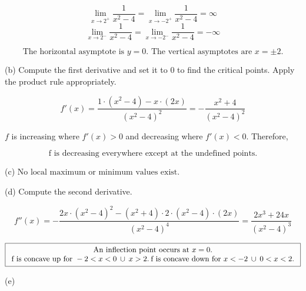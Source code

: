 \documentclass{article}
\begin{document}
\[\lim_{x\to2^+}\frac{1}{x^2-4}=\lim_{x\to-2^+}\frac{1}{x^2-4}=\infty\]
\[\lim_{x\to2^-}\frac{1}{x^2-4}=\lim_{x\to-2^-}\frac{1}{x^2-4}=-\infty\]

\[\boxed{\text{The horizontal asymptote is } y= 0. \text{ The vertical asymptotes are } x=\pm2.}\]

\hfill

\noindent (b) Compute the first derivative and set it to $0$ to find the critical points. Apply the product rule appropriately.

\[f'(x)=\frac{1\cdot\left(x^2-4\right)-x\cdot(2x)}{\left(x^2-4\right)^2}=-\frac{x^2+4}{\left(x^2-4\right)^2}\]

\noindent $f$ is increasing where $f'(x)>0$ and decreasing where $f'(x)<0$. Therefore,

\[\boxed{\text{f is decreasing everywhere except at the undefined points.}}\]

\hfill

\noindent (c) $\boxed{\text{No local maximum or minimum values exist.}}$

\hfill

\noindent (d) Compute the second derivative.

\[f''(x)=-\frac{2x\cdot\left(x^2-4\right)^2-\left(x^2+4\right)\cdot2\cdot(x^2-4)\cdot(2x)}{\left(x^2-4\right)^4}=\frac{2x^3+24x}{\left(x^2-4\right)^3}\]

\[
\boxed{
\begin{array}{c}
\displaystyle \text{An inflection point occurs at }x=0.\\$f$ \text{ is concave up for }-2<x<0\:\cup\: x>2.\:$f$ \text{ is concave down for }x<-2\:\cup\:0<x<2.
\end{array}}\]

\hfill

\noindent (e)
\begin{center}
\end{center}
\end{document}
